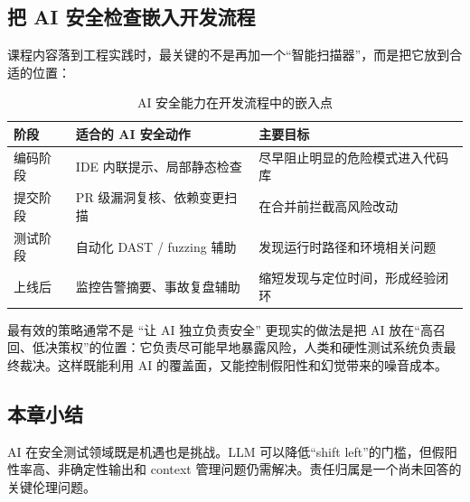 \subsection{把 AI 安全检查嵌入开发流程}

课程内容落到工程实践时，最关键的不是再加一个“智能扫描器”，而是把它放到合适的位置：

\begin{table}[H]
\centering
\begin{tabular}{p{} p{} p{}}
\toprule
阶段 & 适合的 AI 安全动作 & 主要目标 \\
\midrule
编码阶段 & IDE 内联提示、局部静态检查 & 尽早阻止明显的危险模式进入代码库 \\
提交阶段 & PR 级漏洞复核、依赖变更扫描 & 在合并前拦截高风险改动 \\
测试阶段 & 自动化 DAST / fuzzing 辅助 & 发现运行时路径和环境相关问题 \\
上线后 & 监控告警摘要、事故复盘辅助 & 缩短发现与定位时间，形成经验闭环 \\
\bottomrule
\end{tabular}
\caption{AI 安全能力在开发流程中的嵌入点}
\end{table}

\begin{knowledgebox}{最有效的策略通常不是 ``让 AI 独立负责安全''}
更现实的做法是把 AI 放在“高召回、低决策权”的位置：它负责尽可能早地暴露风险，人类和硬性测试系统负责最终裁决。这样既能利用 AI 的覆盖面，又能控制假阳性和幻觉带来的噪音成本。
\end{knowledgebox}

\subsection{本章小结}

AI 在安全测试领域既是机遇也是挑战。LLM 可以降低``shift left''的门槛，但假阳性率高、非确定性输出和 context 管理问题仍需解决。责任归属是一个尚未回答的关键伦理问题。

